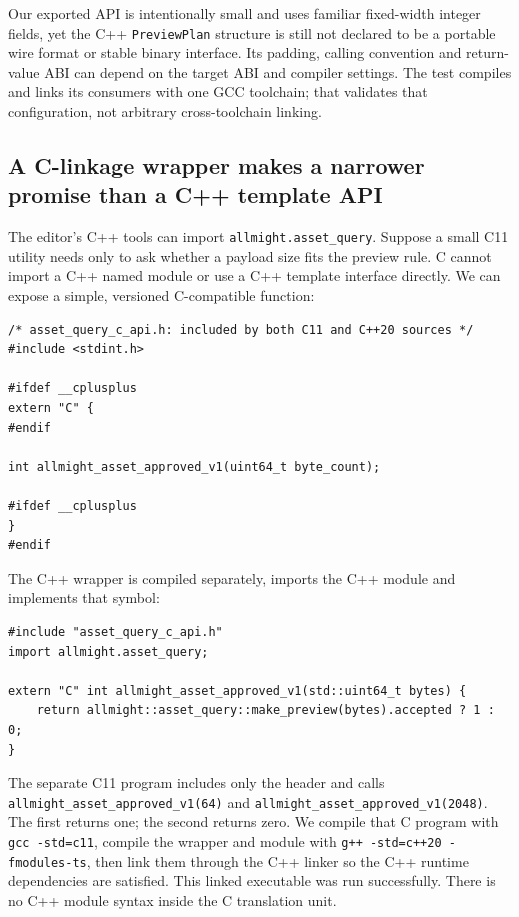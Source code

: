 Our exported API is intentionally small and uses familiar fixed-width integer fields, yet the C++ \texttt{PreviewPlan} structure is still not declared to be a portable wire format or stable binary interface. Its padding, calling convention and return-value ABI can depend on the target ABI and compiler settings. The test compiles and links its consumers with one GCC toolchain; that validates that configuration, not arbitrary cross-toolchain linking.

\subsection{A C-linkage wrapper makes a narrower promise than a C++ template API}\label{01-foundations-i-ch006-a-c-linkage-wrapper-makes-a-narrower-promise-than-a-c-template-api}

The editor's C++ tools can import \texttt{allmight.asset\_query}. Suppose a small C11 utility needs only to ask whether a payload size fits the preview rule. C cannot import a C++ named module or use a C++ template interface directly. We can expose a simple, versioned C-compatible function:

\begin{verbatim}
/* asset_query_c_api.h: included by both C11 and C++20 sources */
#include <stdint.h>

#ifdef __cplusplus
extern "C" {
#endif

int allmight_asset_approved_v1(uint64_t byte_count);

#ifdef __cplusplus
}
#endif
\end{verbatim}

The C++ wrapper is compiled separately, imports the C++ module and implements that symbol:

\begin{verbatim}
#include "asset_query_c_api.h"
import allmight.asset_query;

extern "C" int allmight_asset_approved_v1(std::uint64_t bytes) {
    return allmight::asset_query::make_preview(bytes).accepted ? 1 : 0;
}
\end{verbatim}

The separate C11 program includes only the header and calls \texttt{allmight\_asset\_approved\_v1(64)} and \texttt{allmight\_asset\_approved\_v1(2048)}. The first returns one; the second returns zero. We compile that C program with \texttt{gcc\ -std=c11}, compile the wrapper and module with \texttt{g++\ -std=c++20\ -fmodules-ts}, then link them through the C++ linker so the C++ runtime dependencies are satisfied. This linked executable was run successfully. There is no C++ module syntax inside the C translation unit.

